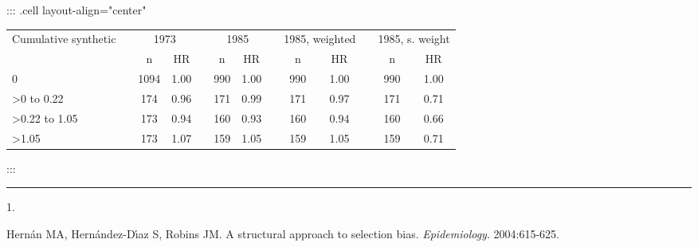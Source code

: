 \documentclass[
  11pt,
  letterpaper,
  DIV=11,
  numbers=noendperiod]{scrartcl}
\newlength{\cslhangindent}
\newlength{\csllabelwidth}
\newlength{\cslentryspacingunit} %
\newenvironment{CSLReferences}[2] %
 {%
  \setlength{\parindent}{0pt}
  \ifodd #1
  \let\oldpar\par
  \def\par{\hangindent=\cslhangindent\oldpar}
  \fi
  \setlength{\parskip}{#2\cslentryspacingunit}
 }%
 {}
\newcommand{\CSLLeftMargin}[1]{\parbox[t]{\csllabelwidth}{#1}}
\newcommand{\CSLRightInline}[1]{\parbox[t]{\linewidth - \csllabelwidth}{#1}\break}
\theoremstyle{remark}\newtheorem*{claim}{Claim}
\begin{document}
\begin{table}[H]
\centering
::: {.cell layout-align="center"}
\begin{tabular}{lcccccccccccc}
  \toprule
  Cumulative synthetic & &\multicolumn{2}{c}{1973} & &\multicolumn{2}{c}{1985} & &\multicolumn{2}{c}{1985, weighted} & &\multicolumn{2}{c}{1985, s. weight}\\
\cline{3-4}\cline{6-7}\cline{9-10}\cline{12-13}
&& n & HR&& n & HR&& n & HR&& n & HR\\ \midrule
0 &  & 1094 & 1.00 &  & 990 & 1.00 &  & 990 & 1.00 &  & 990 & 1.00 \\ 
  >0 to 0.22 &  & 174 & 0.96 &  & 171 & 0.99 &  & 171 & 0.97 &  & 171 & 0.71 \\ 
  >0.22 to 1.05 &  & 173 & 0.94 &  & 160 & 0.93 &  & 160 & 0.94 &  & 160 & 0.66 \\ 
  >1.05 &  & 173 & 1.07 &  & 159 & 1.05 &  & 159 & 1.05 &  & 159 & 0.71 \\ 
   \bottomrule
\end{tabular}
:::
\end{table}

\begin{center}\rule{0.5\linewidth}{0.5pt}\end{center}

\hypertarget{refs}{}
\begin{CSLReferences}{0}{0}
\leavevmode{}%
\CSLLeftMargin{1. }%
\CSLRightInline{Hernán MA, Hernández-Dı́az S, Robins JM. A structural
approach to selection bias. \emph{Epidemiology}. 2004:615-625.}

\end{CSLReferences}
\end{document}
